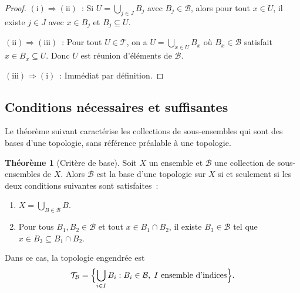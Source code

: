 \documentclass[12pt,a4paper,openany]{book}
\theoremstyle{definition}
\theoremstyle{cours}
\newtheorem{theoreme}{Théorème}[chapter]
\theoremstyle{coursnormal}
\newcommand{\T}{\mathcal{T}}
\newcommand{\B}{\mathcal{B}}
\begin{document}
\begin{proof}
  $\mathrm{(i)\Rightarrow(ii)}$~: Si $U=\bigcup_{j\in J} B_j$ avec
  $B_j\in\B$, alors pour tout $x\in U$, il existe $j\in J$ avec $x\in B_j$ et
  $B_j\subseteq U$.

  $\mathrm{(ii)\Rightarrow(iii)}$~: Pour tout $U\in\T$, on a
  $U = \bigcup_{x\in U} B_x$ où $B_x\in\B$ satisfait $x\in B_x\subseteq U$.
  Donc $U$ est réunion d'éléments de $\B$.

  $\mathrm{(iii)\Rightarrow(i)}$~: Immédiat par définition.
\end{proof}

\subsection{Conditions nécessaires et suffisantes}\label{subsec:base-cns}

Le théorème suivant caractérise les collections de sous-ensembles qui sont des
bases d'une topologie, sans référence préalable à une topologie.

\begin{theoreme}[Critère de base]\label{thm:critere-base}
  Soit $X$ un ensemble et $\B$ une collection de sous-ensembles de $X$. Alors
  $\B$ est la base d'une topologie sur $X$ si et seulement si les deux
  conditions suivantes sont satisfaites~:
  \begin{enumerate}[label=\textup{(B\arabic*)}]
    \item\label{B1} $\displaystyle X = \bigcup_{B\in\B} B$.
    \item\label{B2} Pour tous $B_1,B_2\in\B$ et tout $x\in B_1\cap B_2$, il
      existe $B_3\in\B$ tel que $x\in B_3\subseteq B_1\cap B_2$.
  \end{enumerate}
  Dans ce cas, la topologie engendrée est
  \[
    \T_{\B} = \Bigl\{\bigcup_{i\in I} B_i : B_i\in\B,\;
    I\text{ ensemble d'indices}\Bigr\}.
  \]
\end{theoreme}
\end{document}
